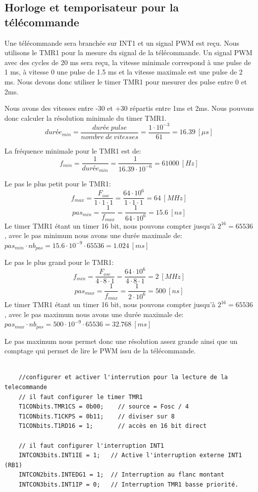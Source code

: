 \documentclass[fleqn, 11pt, a4paper]{article}
\begin{document}
  \subsection{Horloge et temporisateur pour la télécommande}
  Une télécommande sera branchée sur INT1 et un signal PWM est reçu.
  Nous utilisons le TMR1 pour la mesure du signal de la télécommande.
  Un signal PWM avec des cycles de 20 ms sera reçu, la vitesse minimale correspond à une pulse de 1 ms, à vitesse 0 une pulse de 1.5 ms et la vitesse maximale est une pulse de 2 ms.
  Nous devons donc utiliser le timer TMR1 pour mesurer des pulse entre 0 et 2ms.
  
  Nous avons des vitesses entre -30 et +30 répartis entre 1ms et 2ms.
  Nous pouvons donc calculer la résolution minimale du timer TMR1.
  $$durée_{min} = \frac{durée\ pulse}{nombre\ de\ vitesses} = \frac{1 \cdot 10^{-3}}{61} = 16.39 \ [\mu s]$$

  La fréquence minimale pour le TMR1 est de:
  $$f_{min} = \frac{1}{durée_{min}} = \frac{1}{16.39 \cdot 10^{-6}} = 61000\ [Hz]$$
  
  Le pas le plus petit pour le TMR1:
  $$f_{max} = \frac{F_{osc}}{1 \cdot 1 \cdot 1} = \frac{64 \cdot 10^{6}}{1 \cdot 1 \cdot 1} = 64\ [MHz]$$
  $$pas_{min} = \frac{1}{f_{max}}= \frac{1}{64 \cdot 10^{6}} = 15.6\ [ns]$$
  Le timer TMR1 étant un timer 16 bit, nous pouvons compter jusqu'à $2^{16} = 65536$, avec le pas minimum nous avons une durée maximale de: $pas_{min} \cdot nb_{pas} = 15.6 \cdot 10^{-9} \cdot 65536 = 1.024\ [ms]$
  
  Le pas le plus grand pour le TMR1:
    $$f_{min} = \frac{F_{osc}}{4 \cdot 8 \cdot 1} = \frac{64 \cdot 10^{6}}{4 \cdot 8 \cdot 1} = 2\ [MHz]$$
  $$pas_{max} = \frac{1}{f_{max}}= \frac{1}{2 \cdot 10^{6}} = 500\ [ns]$$
    Le timer TMR1 étant un timer 16 bit, nous pouvons compter jusqu'à $2^{16} = 65536$, avec le pas maximum nous avons une durée maximale de: $pas_{max} \cdot nb_{pas} = 500 \cdot 10^{-9} \cdot 65536 = 32.768\ [ms]$
    
    Le pas maximum nous permet donc une résolution assez grande ainsi que un comptage qui permet de lire le PWM issu de la télécommande.
    
    \begin{lstlisting}[caption=Configuration du TMR1, label=lst:tmr1_config]
    
    //configurer et activer l'interrution pour la lecture de la telecommande
    // il faut configurer le timer TMR1
    T1CONbits.TMR1CS = 0b00;    // source = Fosc / 4
    T1CONbits.T1CKPS = 0b11;    // diviser sur 8
    T1CONbits.T1RD16 = 1;       // accès en 16 bit direct

    // il faut configurer l'interruption INT1
    INTCON3bits.INT1IE = 1;   // Active l'interruption externe INT1 (RB1)
    INTCON2bits.INTEDG1 = 1;  // Interruption au flanc montant
    INTCON3bits.INT1IP = 0;   // Interruption TMR1 basse priorité.
    
    \end{lstlisting}
    
\end{document}
